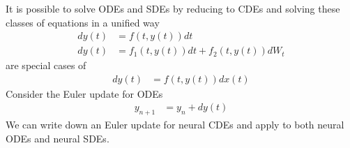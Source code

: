 \documentclass[book.tex]{subfiles}
\begin{document}
It is possible to solve ODEs and SDEs by reducing to CDEs and solving these classes of equations in a unified way
\begin{align}
    dy(t) &= f(t, y(t))dt \\
    dy(t) &= f_1(t, y(t))dt + f_2(t, y(t)) dW_t 
\end{align}
are special cases of
\begin{align}
dy(t) &= f(t, y(t))dx(t)
\end{align}
Consider the Euler update for ODEs
\begin{align}
y_{n+1} &= y_n + dy(t)
\end{align}
We can write down an Euler update for neural CDEs and apply to both neural ODEs and neural SDEs. %
\end{document}

